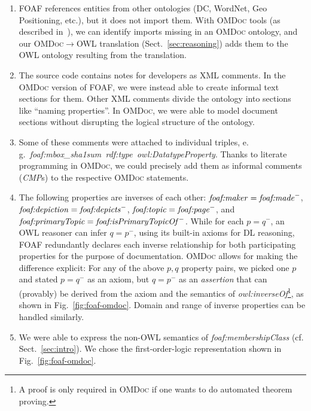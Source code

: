 \documentclass{llncs}
\renewcommand{\omdoc}{\textsc{OMDoc}\xspace}
\begin{document}
\begin{small}
\begin{enumerate}
\item FOAF references entities from other ontologies (DC, WordNet, Geo Positioning,
  etc.), but it does not import them.  With \omdoc tools (as described
  in~\cite{RabeKohlhase:ExchangeModularKnowledge}), we can identify imports missing in an
  \omdoc ontology, and our {\omdoc}$\to$OWL translation (Sect.~\ref{sec:reasoning}) adds
  them to the OWL ontology resulting from the translation.
\item The source code contains notes for developers as XML comments.  In the \omdoc
  version of FOAF, we were instead able to create informal text sections for them.  Other
  XML comments divide the ontology into sections like ``naming properties''.  In \omdoc,
  we were able to model document sections without disrupting the logical structure of the
  ontology.
\item Some of these comments were attached to individual triples, e.\,g.\
  \textit{foaf:mbox\_sha1sum\ rdf:type\ owl:DatatypeProperty}.  Thanks to literate
  programming in \omdoc, we could precisely add them as informal comments (\textit{CMP}s)
  to the respective \omdoc statements.
\item The following properties are inverses of each other:
  $\text{\textit{foaf:maker}}=\text{\textit{foaf:made}}^{-}$,
  $\text{\textit{foaf:depiction}}=\text{\textit{foaf:depicts}}^{-}$,
  $\text{\textit{foaf:topic}}=\text{\textit{foaf:page}}^{-}$, and
  $\text{\textit{foaf:primaryTopic}}=\text{\textit{foaf:isPrimaryTopicOf}}^{-}$.  While
  for each $p= q^{-}$, an OWL reasoner can infer $q= p^{-}$, using its built-in axioms for
  DL reasoning, FOAF redundantly declares each inverse relationship for both participating
  properties for the purpose of documentation.  \omdoc allows for making the difference
  explicit: For any of the above $p, q$ property pairs, we picked one $p$ and stated $p=
  q^{-}$ as an axiom, but $q= p^{-}$ as an \emph{assertion} that can (provably) be derived
  from the axiom and the semantics of \textit{owl:inverseOf}\ifpublic\else\footnote{A
    proof is only required in \omdoc if one wants to do automated theorem proving.}\fi, as
  shown in Fig.~\ref{fig:foaf-omdoc}.  Domain and range of inverse properties can be
  handled similarly.
\item We were able to express the non-OWL semantics of
  \textit{foaf:membershipClass} (cf. Sect.~\ref{sec:intro}).  We chose the
  first-order-logic representation shown in Fig.~\ref{fig:foaf-omdoc}.

\end{enumerate}
\end{small}
\end{document}
